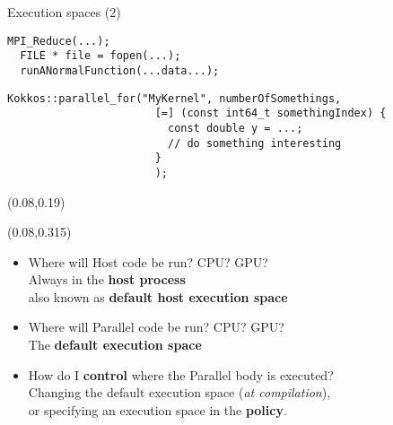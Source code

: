 \ifmedium
\begin{frame}[fragile]{Execution spaces (2)}


  \begin{lstlisting}[linebackgroundcolor={
        \btLstHL{1-3}{darkred!20}
      }
    ]
  MPI_Reduce(...);
  FILE * file = fopen(...);
  runANormalFunction(...data...);
  \end{lstlisting}

  \vspace{-11pt}

  \begin{lstlisting}[linebackgroundcolor={
        \btLstHL{3-4}{bodyColor}
      }
    ]
  Kokkos::parallel_for("MyKernel", numberOfSomethings,
                       [=] (const int64_t somethingIndex) {
                         const double y = ...;
                         // do something interesting
                       }
                       );
  \end{lstlisting}

  \vspace{-5pt}

  \begin{textblock*}{0.5\textwidth}(0.08\textwidth,0.19\textheight)
  \end{textblock*}

  \begin{textblock*}{0.5\textwidth}(0.08\textwidth,0.315\textheight)
  \end{textblock*}

  \pause

  \begin{itemize}
    \item<2->{Where will {\color{darkred!80}Host} code be run?  CPU?  GPU? \\
        \hspace{20pt}{$\Rightarrow$} Always in the \textbf{host process} \\
        \hspace{20pt} also known as \textbf{default host execution space}}
    \item<3->{Where will {\color{blue!80}Parallel} code be run?  CPU?  GPU? \\
      \hspace{20pt}{$\Rightarrow$} The \textbf{default execution space}}
    \item<4->{How do I \textbf{control} where the {\color{blue!80}Parallel} body is executed? \\
      \hspace{20pt}Changing the default execution space (\textit{at compilation}), \\
      \hspace{20pt}or specifying an execution space in the \textbf{policy}.}
  \end{itemize}

\end{frame}
\fi

